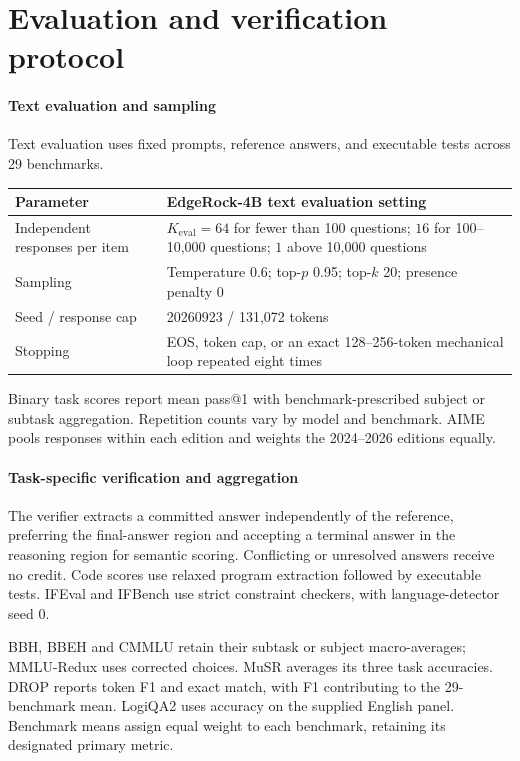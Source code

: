 \section{Evaluation and verification protocol}
\label{app:protocol}

\paragraph{Text evaluation and sampling}
Text evaluation uses fixed prompts, reference answers, and executable tests across 29 benchmarks.

\begin{table}[!htbp]
\small
\begin{tabularx}{\textwidth}{@{}p{4.7cm}X@{}}
\toprule
Parameter & EdgeRock-4B text evaluation setting\\
\midrule
Independent responses per item & $K_{\mathrm{eval}}=64$ for fewer than 100 questions; $16$ for 100--10,000 questions; $1$ above 10,000 questions\\
Sampling & Temperature 0.6; top-$p$ 0.95; top-$k$ 20; presence penalty 0\\
Seed / response cap & 20260923 / 131,072 tokens\\
Stopping & EOS, token cap, or an exact 128--256-token mechanical loop repeated eight times\\
\bottomrule
\end{tabularx}
\end{table}

Binary task scores report mean pass@1 with benchmark-prescribed subject or subtask aggregation. Repetition counts vary by model and benchmark. AIME pools responses within each edition and weights the 2024--2026 editions equally.

\paragraph{Task-specific verification and aggregation}
The verifier extracts a committed answer independently of the reference, preferring the final-answer region and accepting a terminal answer in the reasoning region for semantic scoring. Conflicting or unresolved answers receive no credit. Code scores use relaxed program extraction followed by executable tests. IFEval and IFBench use strict constraint checkers, with language-detector seed 0.

BBH, BBEH and CMMLU retain their subtask or subject macro-averages; MMLU-Redux uses corrected choices. MuSR averages its three task accuracies. DROP reports token F1 and exact match, with F1 contributing to the 29-benchmark mean. LogiQA2 uses accuracy on the supplied English panel. Benchmark means assign equal weight to each benchmark, retaining its designated primary metric.

